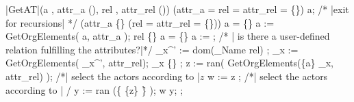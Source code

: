 	{\small
	\NumberProgramstrue
	\begin{algorithm}[GetAT]\label{alg:GetAT}
	\begin{program}
	\FUNCT |GetAT|(a \subset \a, attr_a \subset (\Bezeichner \times \WerteMenge), rel \in \relname, attr_{rel} \subset (\Bezeichner \times \WerteMenge)) \subset \a
	\BEGIN
	\IF (attr_a = rel = attr_{rel} = \{\})\label{alg:GetAT:trivial}
	\THEN \RETURN \quad a;
	\FI
	/* |exit for recursions| */
	\IF (attr_a \neq \{\} \wedge (rel = attr_{rel} = \{\})) \label{alg:GetAT:Aussprung}
	\THEN
		\IF a = \{\} \THEN a := \a \FI \label{alg:GetAT:A-Erweiterung}
		\RETURN \quad  GetOrgElements( a, attr_a ); \label{alg:GetAT:1}
	\FI
	\IF rel \neq \{\} \label{alg:GetAT:komplex}
	\THEN
		\IF a = \{\} \THEN a := \a \FI
		\var {};
		/* | is there a user-defined relation fulfilling the attributes?|*/
		\rel_x^{'} := dom(\rel_{Name} \rhd rel) \cap \relmengebenutzerFA; \label{alg:GetAT:FA}
		\rel_x := GetOrgElements( \rel_x^{'}, attr_{rel});
		\IF \rel_x \neq \{\}
		\THEN
			\var {};
			z := ran( GetOrgElements(\{a\} \lhd \rel_x, attr_{rel}) );
			/*| select the actors according to |$z$
			w := z \cap \a;
			/*| select the actors according to | \relstrukturFA */
			y := ran (\{ \{z\} \cap \f\} \lhd \relstrukturFA);
			\RETURN \quad w \cup y;
		\ELSE
			\var {};

\end{program}
\end{algorithm}}
